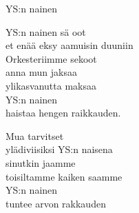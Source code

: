 \begin{song}{YS:n nainen}

    YS:n nainen sä oot\\
    et enää eksy aamuisin duuniin\\
    Orkesteriimme sekoot\\
    anna mun jaksaa\\
    ylikasvanutta maksaa\\
    YS:n nainen\\
    haistaa hengen raikkauden.

    Mua tarvitset\\
    ylädiviisiksi YS:n naisena\\
    sinutkin jaamme\\
    toisiltamme kaiken saamme\\
    YS:n nainen\\
    tuntee arvon rakkauden

\end{song}